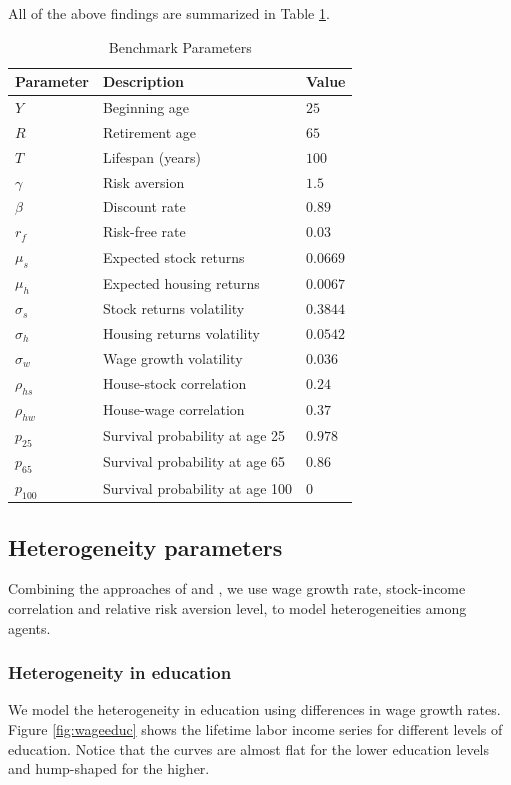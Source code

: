 \documentclass[]{elsarticle}
\begin{document}
All of the above findings are summarized in Table \ref{table:default}. 

\begin{table}[h!]
	\centering
	\caption{Benchmark Parameters}
	\label{table:default}
	\begin{tabular}[c]{lll}
		\hline
		Parameter&Description&Value\\
		\hline
		$Y$&Beginning age&$25$\\
		$R$&Retirement age&$65$\\
		$T$&Lifespan (years)&$100$\\
		$\gamma$&Risk aversion&$1.5$\\
		$\beta$&Discount rate&$0.89$\\
		$r_f$&Risk-free rate&$0.03$\\
		\hline
		$\mu_s$&Expected stock returns&$0.0669$\\
		$\mu_h$&Expected housing returns&$0.0067$\\
		$\sigma_s$&Stock returns volatility&$0.3844$\\
		$\sigma_h$&Housing returns volatility&$0.0542$\\
		$\sigma_w$&Wage growth volatility&$0.036$\\
		$\rho_{hs}$&House-stock correlation&$0.24$\\
		$\rho_{hw}$&House-wage correlation&$0.37$\\
		\hline
		$p_{25}$&Survival probability at age 25&$0.978$\\
		$p_{65}$&Survival probability at age 65&$0.86$\\
		$p_{100}$&Survival probability at age 100&$0$\\	
		\hline
	\end{tabular}
\end{table}


\subsection{Heterogeneity parameters}
Combining the approaches of \citet{olear} and \citet{munk}, we use wage growth rate, stock-income correlation and relative risk aversion level, to model heterogeneities among agents.

\subsubsection{Heterogeneity in education}
We model the heterogeneity in education using differences in wage growth rates. Figure \ref{fig:wageeduc} shows the lifetime labor income series for different levels of education. Notice that the curves are almost flat for the lower education levels and hump-shaped for the higher.
\end{document}
